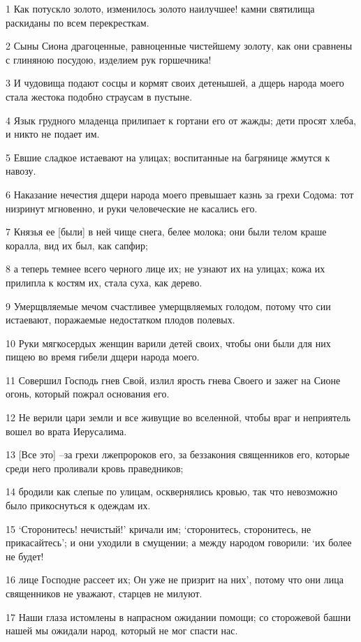 \par 1 Как потускло золото, изменилось золото наилучшее! камни святилища раскиданы по всем перекресткам.
\par 2 Сыны Сиона драгоценные, равноценные чистейшему золоту, как они сравнены с глиняною посудою, изделием рук горшечника!
\par 3 И чудовища подают сосцы и кормят своих детенышей, а дщерь народа моего стала жестока подобно страусам в пустыне.
\par 4 Язык грудного младенца прилипает к гортани его от жажды; дети просят хлеба, и никто не подает им.
\par 5 Евшие сладкое истаевают на улицах; воспитанные на багрянице жмутся к навозу.
\par 6 Наказание нечестия дщери народа моего превышает казнь за грехи Содома: тот низринут мгновенно, и руки человеческие не касались его.
\par 7 Князья ее [были] в ней чище снега, белее молока; они были телом краше коралла, вид их был, как сапфир;
\par 8 а теперь темнее всего черного лице их; не узнают их на улицах; кожа их прилипла к костям их, стала суха, как дерево.
\par 9 Умерщвляемые мечом счастливее умерщвляемых голодом, потому что сии истаевают, поражаемые недостатком плодов полевых.
\par 10 Руки мягкосердых женщин варили детей своих, чтобы они были для них пищею во время гибели дщери народа моего.
\par 11 Совершил Господь гнев Свой, излил ярость гнева Своего и зажег на Сионе огонь, который пожрал основания его.
\par 12 Не верили цари земли и все живущие во вселенной, чтобы враг и неприятель вошел во врата Иерусалима.
\par 13 [Все это] --за грехи лжепророков его, за беззакония священников его, которые среди него проливали кровь праведников;
\par 14 бродили как слепые по улицам, осквернялись кровью, так что невозможно было прикоснуться к одеждам их.
\par 15 `Сторонитесь! нечистый!' кричали им; `сторонитесь, сторонитесь, не прикасайтесь'; и они уходили в смущении; а между народом говорили: `их более не будет!
\par 16 лице Господне рассеет их; Он уже не призрит на них', потому что они лица священников не уважают, старцев не милуют.
\par 17 Наши глаза истомлены в напрасном ожидании помощи; со сторожевой башни нашей мы ожидали народ, который не мог спасти нас.

